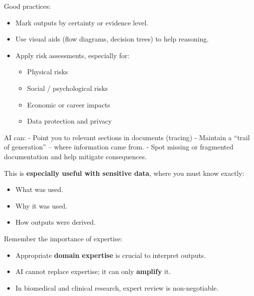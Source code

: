 \documentclass[
  letterpaper,
  DIV=11,
  numbers=noendperiod]{scrreprt}
\providecommand{\tightlist}{%
  \setlength{\itemsep}{0pt}\setlength{\parskip}{0pt}}
\begin{document}
Good practices:

\begin{itemize}
\tightlist
\item
  Mark outputs by certainty or evidence level.
\item
  Use visual aids (flow diagrams, decision trees) to help reasoning.
\item
  Apply risk assessments, especially for:

  \begin{itemize}
  \tightlist
  \item
    Physical risks
  \item
    Social / psychological risks
  \item
    Economic or career impacts
  \item
    Data protection and privacy
  \end{itemize}
\end{itemize}

AI can: - Point you to relevant sections in documents (tracing) -
Maintain a ``trail of generation'' -- where information came from. -
Spot missing or fragmented documentation and help mitigate consequences.

This is \textbf{especially useful with sensitive data}, where you must
know exactly:

\begin{itemize}
\tightlist
\item
  What was used.
\item
  Why it was used.
\item
  How outputs were derived.
\end{itemize}

Remember the importance of expertise:

\begin{itemize}
\tightlist
\item
  Appropriate \textbf{domain expertise} is crucial to interpret outputs.
\item
  AI cannot replace expertise; it can only \textbf{amplify} it.
\item
  In biomedical and clinical research, expert review is non-negotiable.
\end{itemize}
\end{document}
